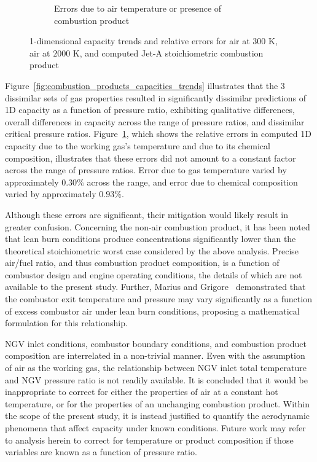 \documentclass[a4paper, 11pt, oneside]{report}
\begin{document}
\begin{figure}[H]
\begin{subfigure}{.45\textwidth}
		\caption{Errors due to air temperature or presence of combustion product}
		\label{fig:combustion_products_capacities_errors}
	\end{subfigure}
	\caption{1-dimensional capacity trends and relative errors for air at $300$ K, air at $2000$ K, and computed Jet-A stoichiometric combustion product}
	\label{fig:combustion_products_capacities}
\end{figure}

Figure~\ref{fig:combustion_products_capacities_trends} illustrates that the 3 dissimilar sets of gas properties resulted in significantly dissimilar predictions of 1D capacity as a function of pressure ratio, exhibiting qualitative differences, overall differences in capacity across the range of pressure ratios, and dissimilar critical pressure ratios. Figure~\ref{fig:combustion_products_capacities_errors}, which shows the relative errors in computed 1D capacity due to the working gas's temperature and due to its chemical composition, illustrates that these errors did not amount to a constant factor across the range of pressure ratios. Error due to gas temperature varied by approximately $0.30\%$ across the range, and error due to chemical composition varied by approximately $0.93\%$.

Although these errors are significant, their mitigation would likely result in greater confusion. Concerning the non-air combustion product, it has been noted that lean burn conditions produce  concentrations significantly lower than the theoretical stoichiometric worst case considered by the above analysis. Precise air/fuel ratio, and thus combustion product composition, is a function of combustor design and engine operating conditions, the details of which are not available to the present study. Further, Marius and Grigore~\cite{marius_air_excess} demonstrated that the combustor exit temperature and pressure may vary significantly as a function of excess combustor air under lean burn conditions, proposing a mathematical formulation for this relationship.

NGV inlet conditions, combustor boundary conditions, and combustion product composition are interrelated in a non-trivial manner. Even with the assumption of air as the working gas, the relationship between NGV inlet total temperature and NGV pressure ratio is not readily available. It is concluded that it would be inappropriate to correct for either the properties of air at a constant hot temperature, or for the properties of an unchanging combustion product. Within the scope of the present study, it is instead justified to quantify the aerodynamic phenomena that affect capacity under known conditions. Future work may refer to analysis herein to correct for temperature or product composition if those variables are known as a function of pressure ratio. 
\end{document}
